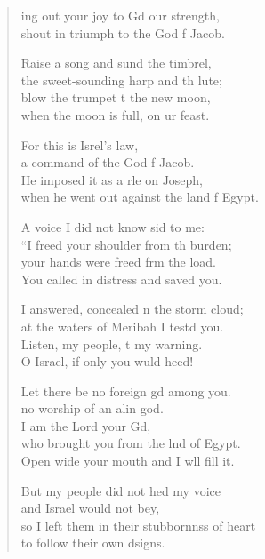 \settowidth{\versewidth}{I answered, concealed in the storm cloud;}
\begin{verse}%
  \begin{patverse}
ing out your joy to Gd our strength,\Med\\
shout in triumph to the God f Jacob.

Raise a song and sund the timbrel,\Med\\
the sweet-sounding harp and th lute;\\
blow the trumpet t the new moon,\Med\\
when the moon is full, on ur feast.

For this is Isrel’s law,\Med\\
a command of the God f Jacob.\\
He imposed it as a rle on Joseph,\Med\\
when he went out against the land f Egypt.

A voice I did not know sid to me:\Med\\
“I freed your shoulder from th burden;\\
your hands were freed frm the load.\Med\\
You called in distress and  saved you.

I answered, concealed \pointup{\i}n the storm cloud;\Med\\
at the waters of Meribah I testd you.\\
Listen, my people, t my warning.\Med\\
O Israel, if only you wuld heed!

Let there be no foreign gd among you.\Med\\
no worship of an alin god.\\
I am the Lord your Gd,\Flex\\
who brought you from the lnd of Egypt.\Med\\
Open wide your mouth and I w\pointup{\i}ll fill it.

But my people did not hed my voice\Med\\
and Israel would not bey,\\
so I left them in their stubbornnss of heart\Med\\
to follow their own dsigns.


\end{patverse}
\end{verse}
